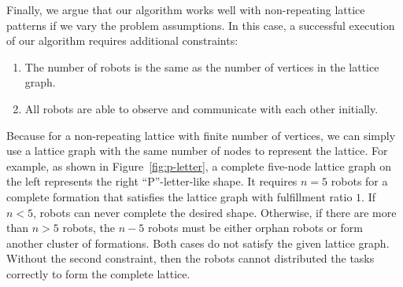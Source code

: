 Finally, we argue that our algorithm works well with non-repeating lattice patterns if we vary the problem assumptions.
%
In this case, a successful execution of our algorithm requires additional constraints: 
\begin{enumerate}
  \item The number of robots is the same as the number of vertices in the lattice graph.
  \item All robots are able to observe and communicate with each other initially.
\end{enumerate}
Because for a non-repeating lattice with finite number of vertices, 
we can simply use a lattice graph with the same number of nodes to represent the lattice.
%
For example, as shown in Figure~\ref{fig:p-letter}, a complete five-node lattice graph on the left represents the right ``P''-letter-like shape. 
%
It requires $n=5$ robots for a complete formation that satisfies the lattice graph with fulfillment ratio $1$.
If $n<5$, robots can never complete the desired shape. 
Otherwise, if there are more than $n>5$ robots, the $n-5$ robots must be either orphan robots or form another cluster of formations. 
Both cases do not satisfy the given lattice graph. 
% 
Without the second constraint, then the robots cannot distributed the tasks correctly to form the complete lattice.
